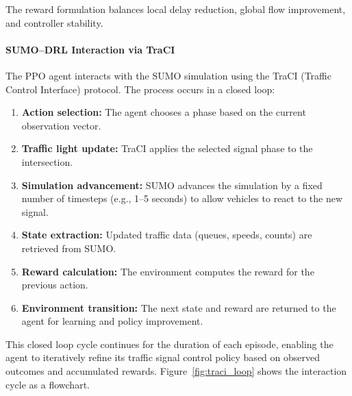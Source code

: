 ﻿\documentclass[11pt, a4paper]{report}
\begin{document}
The reward formulation balances local delay reduction, global flow improvement, and controller stability.

\paragraph{SUMO--DRL Interaction via TraCI}

The PPO agent interacts with the SUMO simulation using the TraCI (Traffic Control Interface) protocol. The process occurs in a closed loop:

\begin{enumerate}
    \item \textbf{Action selection:} The agent chooses a phase based on the current observation vector.
    \item \textbf{Traffic light update:} TraCI applies the selected signal phase to the intersection.
    \item \textbf{Simulation advancement:} SUMO advances the simulation by a fixed number of timesteps (e.g., 1--5 seconds) to allow vehicles to react to the new signal.
    \item \textbf{State extraction:} Updated traffic data (queues, speeds, counts) are retrieved from SUMO.
    \item \textbf{Reward calculation:} The environment computes the reward for the previous action.
    \item \textbf{Environment transition:} The next state and reward are returned to the agent for learning and policy improvement.
\end{enumerate}

This closed loop cycle continues for the duration of each episode, enabling the agent to iteratively refine its traffic signal control policy based on observed outcomes and accumulated rewards. Figure~\ref{fig:traci_loop} shows the interaction cycle as a flowchart.
\end{document}
